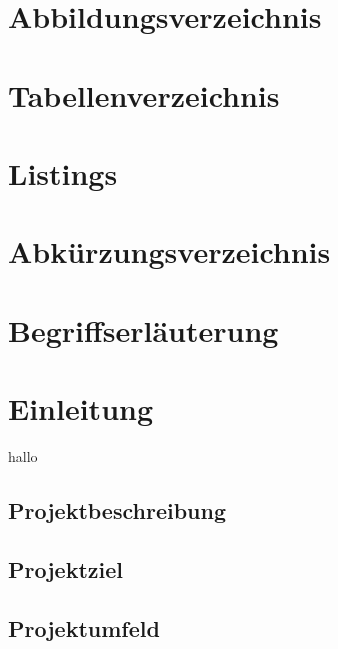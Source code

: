 \documentclass[12pt,toc=sectionentrywithoutdots, headheight=44pt, headings=optiontoheadandtoc]{scrartcl}
\begin{document}
\newpage
\setcounter{page}{1}


\tableofcontents


\setcounter{secnumdepth}{0}

\newpage
\section{Abbildungsverzeichnis}
\blindtext\blindtext\blindtext
\newpage

\section{Tabellenverzeichnis}
\blindtext\blindtext\blindtext

\section{Listings}
\blindtext\blindtext\blindtext
\newpage

\section{Abkürzungsverzeichnis}
\blindtext\blindtext
\newpage

\section{Begriffserläuterung}
\blindtext\blindtext
\newpage

\setcounter{secnumdepth}{4}

\section{Einleitung}
hallo

\subsection{Projektbeschreibung}
\blindtext


\subsection{Projektziel}
\blindtext

\subsection{Projektumfeld}
\blindtext\
\end{document}
